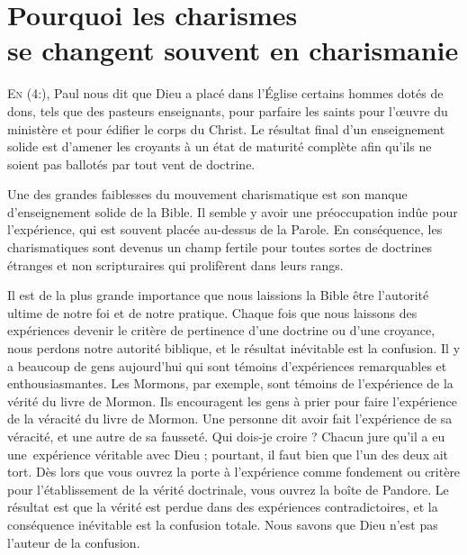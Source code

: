 \chapter[Pourquoi les charismes se changent souvent en charismanie]{Pourquoi les charismes\\ se changent souvent en charismanie}
\renewcommand{\chaphead}{\textls[0]{Pourquoi les charismes se changent souvent en charismanie}}

\lettrine{E}{n (4:),}
 Paul nous dit que Dieu a placé dans l'Église
 certains hommes dotés de dons, tels que des pasteurs enseignants,
 pour parfaire les saints pour l'œuvre du ministère et pour édifier le corps
 du Christ. Le résultat final d'un enseignement solide est d'amener
 les croyants à un état de maturité complète afin qu'ils ne soient
 pas ballotés par tout vent de doctrine.

Une des grandes faiblesses du mouvement charismatique est son manque
 d'enseignement solide de la Bible. Il semble y avoir une préoccupation
 indûe pour l'expérience, qui est souvent placée au-dessus de la Parole.
 En conséquence, les charismatiques sont devenus un champ fertile
 pour toutes sortes de doctrines étranges et non scripturaires qui prolifèrent
 dans leurs rangs.

Il est de la plus grande importance que nous laissions la Bible être
 l'autorité ultime de notre foi et de notre pratique.
 Chaque fois que nous laissons des expériences
 devenir le critère de pertinence d'une doctrine ou d'une croyance,
 nous perdons notre autorité biblique, et le résultat inévitable
 est la confusion. Il y a beaucoup de gens aujourd'hui qui sont témoins
 d'expériences remarquables et enthousiasmantes. Les Mormons, par exemple,
 \Og sont témoins \Fg{} de l'expé\-rience de la vérité du livre de Mormon.
 Ils encouragent les gens à prier pour faire l'expérience de la véracité
 du livre de Mormon. Une personne dit avoir fait l'expérience
 de sa véracité, et une autre de sa fausseté. Qui dois-je croire ?
 Chacun jure qu'il a eu une~expérience véritable avec Dieu ;
 pourtant, il faut bien que l'un des deux ait tort.
 Dès lors que vous ouvrez la porte à l'expérience comme fondement
 ou critère pour l'établissement de la vérité doctrinale, vous ouvrez la boîte de Pandore.
 Le résultat est que la vérité est perdue dans des expériences
 contradictoires, et la conséquence inévitable est la confusion totale.
 Nous savons que Dieu n'est pas l'auteur de la confusion.


